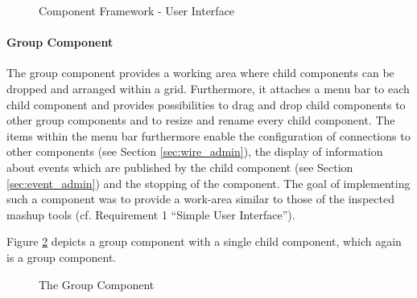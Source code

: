 \begin{figure}
	\centering
	\caption{Component Framework - User Interface}
	\label{fig:framework_ui}
\end{figure}

\paragraph{Group Component}
The group component provides a working area where child components can be dropped and arranged
within a grid. Furthermore, it attaches a menu bar to each child component and provides
possibilities to drag and drop child components to other group components and to resize and rename every child component. The
items within the menu bar furthermore enable the configuration of connections to other components
(see Section \ref{sec:wire_admin}), the display of information about events which are
published by the child component (see Section \ref{sec:event_admin}) and the stopping
of the component.\newline
The goal of implementing such a component was to provide a work-area similar to those of the
inspected mashup tools (cf. Requirement 1 ``Simple User Interface'').

Figure \ref{fig:group_component} depicts a group component with a single child component, which
again is a group component.

\begin{figure}
	\centering
	\caption{The Group Component}
	\label{fig:group_component}
\end{figure}

